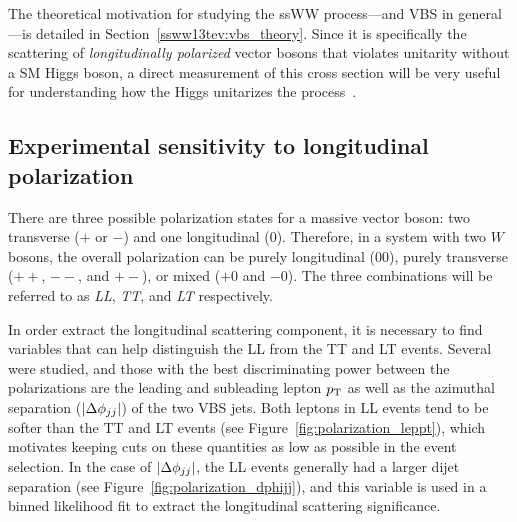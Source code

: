 The theoretical motivation for studying the ssWW process---and VBS in general---is detailed in Section~\ref{ssww13tev:vbs_theory}.
Since it is specifically the scattering of \emph{longitudinally polarized} vector bosons that violates unitarity without a SM Higgs boson, a direct measurement of this cross section will be very useful for understanding how the Higgs unitarizes the process~\cite{2013.longitudinal-theory}.


\subsection{Experimental sensitivity to longitudinal polarization}\label{sec:sswwupgrade_longitudinal_sens}
There are three possible polarization states for a massive vector boson: two transverse ($+$ or $-$) and one longitudinal ($0$).
Therefore, in a system with two $W$ bosons, the overall polarization can be purely longitudinal ($00$), purely transverse ($++$, $--$, and $+-$), or mixed ($+0$ and $-0$).
The three combinations will be referred to as \emph{LL}, \emph{TT}, and \emph{LT} respectively.

In order extract the longitudinal scattering component, it is necessary to find variables that can help distinguish the LL from the TT and LT events.
Several were studied, and those with the best discriminating power between the polarizations are the leading and subleading lepton $p_{\mathrm{T}}$ as well as the azimuthal separation ($|\Delta\phi_{jj}|$) of the two VBS jets.
Both leptons in LL events tend to be softer than the TT and LT events (see Figure~\ref{fig:polarization_leppt}), which motivates keeping cuts on these quantities as low as possible in the event selection.%
In the case of $|\Delta\phi_{jj}|$, the LL events generally had a larger dijet separation (see Figure~\ref{fig:polarization_dphijj}), and this variable is used in a binned likelihood fit to extract the longitudinal scattering significance.

